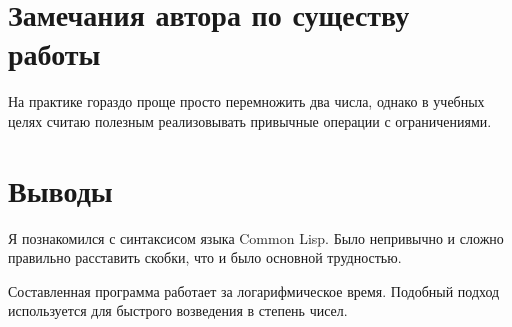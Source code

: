 \documentclass[12pt]{article}
\begin{document}
\section{Замечания автора по существу работы}
На практике гораздо проще просто перемножить два числа, однако в учебных целях считаю полезным реализовывать привычные операции с ограничениями.

\section{Выводы}
Я познакомился с синтаксисом языка Common Lisp. Было непривычно и сложно правильно расставить скобки, что и было основной трудностью.

Составленная программа работает за логарифмическое время. Подобный подход используется для быстрого возведения в степень чисел.
\end{document}
